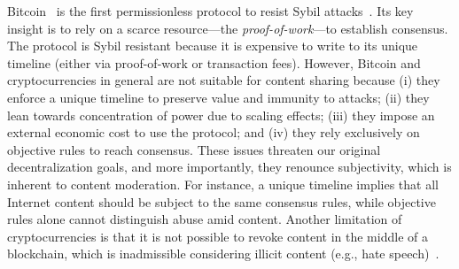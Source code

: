 \documentclass[12pt]{article}
\begin{document}
Bitcoin~\cite{p2p.bitcoin} is the first permissionless protocol to resist
Sybil attacks~\cite{p2p.sybil}.
Its key insight is to rely on a scarce resource---the \emph{proof-of-work}---to
establish consensus.
The protocol is Sybil resistant because it is expensive to write to its
unique timeline (either via proof-of-work or transaction fees).
%
However, Bitcoin and cryptocurrencies in general are not suitable for content
sharing because
    (i)   they enforce a unique timeline to preserve value and immunity to
          attacks;
    (ii)  they lean towards concentration of power due to scaling effects;
    (iii) they impose an external economic cost to use the protocol; and
    (iv)  they rely exclusively on objective rules to reach consensus.
%
These issues threaten our original decentralization goals, and more
importantly, they renounce subjectivity, which is inherent to content
moderation.
%
For instance, a unique timeline implies that all Internet content should be
subject to the same consensus rules, while objective rules alone cannot
distinguish abuse amid content.
%
Another limitation of cryptocurrencies is that it is not possible to revoke
content in the middle of a blockchain, which is inadmissible considering
illicit content (e.g., hate speech)~\cite{btc.content}.
\end{document}
